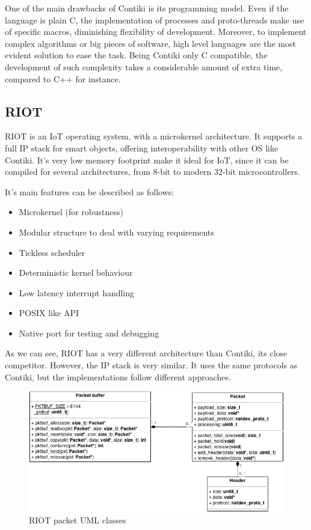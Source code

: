 One of the main drawbacks of Contiki is its programming model.
Even if the language is plain C, the implementation of processes and proto-threads make use of specific macros, diminishing flexibility of development.
Moreover, to implement complex algorithms or big pieces of software, high level languages are the most evident solution to ease the task.
Being Contiki only C compatible, the development of such complexity takes a considerable amount of extra time, compared to C++ for instance.

\subsection{RIOT}
RIOT is an IoT operating system\cite{baccelli2013riot}, with a microkernel architecture.
It supports a full IP stack for smart objects, offering interoperability with other OS like Contiki.
It's very low memory footprint make it ideal for IoT, since it can be compiled for several architectures, from 8-bit to modern 32-bit microcontrollers.

It's main features can be described as follows:

\begin{itemize}
	\item Microkernel (for robustness)
	\item Modular structure to deal with varying requirements
	\item Tickless scheduler
	\item Deterministic kernel behaviour
	\item Low latency interrupt handling
	\item POSIX like API
	\item Native port for testing and debugging
\end{itemize}

As we can see, RIOT has a very different architecture than Contiki, its close competitor.
However, the IP stack is very similar.
It uses the same protocols as Contiki, but the implementations follow different approaches.

\begin{figure}[htb]
	\centering
	\includegraphics[width=1\columnwidth]{chapters/background.images/pktbuf-uml-class.png}
	\caption{RIOT packet UML classes}
	\label{fig:RIOTpktBuf}
\end{figure}

